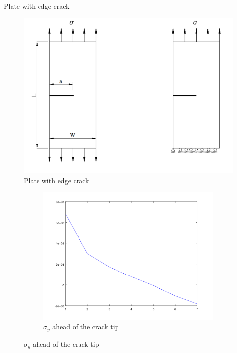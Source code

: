 \documentclass{beamer}
\begin{document}
\begin{frame}[t,fragile]{Plate with edge crack}
    \vspace{-.4cm}
   \begin{figure}[H]
    \centering
        \includegraphics[scale=.15]{1.png}
        \vspace{-10pt}
        \caption{\tiny Plate with edge crack}
    \end{figure}
        \vspace{-16pt}
    \begin{figure}
    \begin{subfigure}{.3\textwidth}
         \includegraphics[scale=.2]{onlystress}
    \caption{\tiny $\sigma_y$ ahead of the crack tip}
    \label{stress}

\end{subfigure}
\end{figure}
\end{frame}
\end{document}
